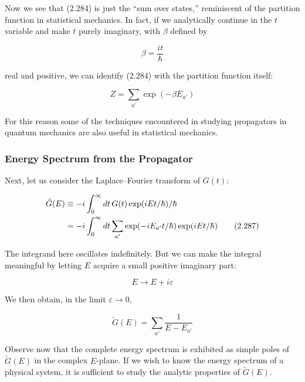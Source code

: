 \documentclass[11pt,a4paper]{article}
\begin{document}
Now we see that (2.284) is just the ``sum over states,'' reminiscent of the partition function in statistical mechanics. In fact, if we analytically continue in the $t$ variable and make $t$ purely imaginary, with $\beta$ defined by

\begin{equation}
\beta = \frac{it}{\hbar}
\tag{2.285}
\end{equation}

real and positive, we can identify (2.284) with the partition function itself:

\begin{equation}
\boxed{Z = \sum_{a'}\exp(-\beta E_{a'})}
\tag{2.286}
\end{equation}

For this reason some of the techniques encountered in studying propagators in quantum mechanics are also useful in statistical mechanics.

\subsubsection{Energy Spectrum from the Propagator}

Next, let us consider the Laplace--Fourier transform of $G(t)$:

\begin{align}
\tilde{G}(E) &\equiv -i\int_0^{\infty} dt\,G(t)\exp(iEt/\hbar)/\hbar \notag \\
&= -i\int_0^{\infty} dt\sum_{a'}\exp(-iE_{a'}t/\hbar)\exp(iEt/\hbar)
\tag{2.287}
\end{align}

The integrand here oscillates indefinitely. But we can make the integral meaningful by letting $E$ acquire a small positive imaginary part:

\begin{equation}
E \to E + i\varepsilon
\tag{2.288}
\end{equation}

We then obtain, in the limit $\varepsilon \to 0$,

\begin{equation}
\boxed{\tilde{G}(E) = \sum_{a'}\frac{1}{E - E_{a'}}}
\tag{2.289}
\end{equation}

Observe now that the complete energy spectrum is exhibited as simple poles of $\tilde{G}(E)$ in the complex $E$-plane. If we wish to know the energy spectrum of a physical system, it is sufficient to study the analytic properties of $\tilde{G}(E)$.
\end{document}
